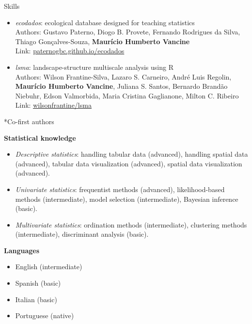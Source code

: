 \documentclass{resume}
\begin{document}
\begin{rSection}{Skills}
\begin{itemize}
\item \textit{ecodados}: ecological database designed for teaching statistics\\
Authors: Gustavo Paterno, Diogo B. Provete, Fernando Rodrigues da Silva, Thiago Gonçalves-Souza, \textbf{Maurício Humberto Vancine}\\
Link: \href{https://paternogbc.github.io/ecodados/}{\underline{paternogbc.github.io/ecodados}}

\item \textit{lsma}: landscape-structure multiscale analysis using R\\
Authors: Wilson Frantine-Silva, Lazaro S. Carneiro, André Luis Regolin, \textbf{Maurício Humberto Vancine}, Juliana S. Santos, Bernardo Brandão Niebuhr, Edson Valmorbida, Maria Cristina Gaglianone, Milton C. Ribeiro\\
Link: \href{https://github.com/wilsonfrantine/landscapeDecoupler}{\underline{wilsonfrantine/lsma}}

\end{itemize} 

*Co-first authors

\textbf{Statistical knowledge}

\begin{itemize} 
\item \textit{Descriptive statistics}: handling tabular data (advanced), handling spatial data (advanced), tabular data visualization (advanced), spatial data visualization (advanced).

\item \textit{Univariate statistics}: frequentist methods (advanced), likelihood-based methods (intermediate), model selection (intermediate), Bayesian inference (basic).

\item \textit{Multivariate statistics}: ordination methods (intermediate), clustering methods (intermediate), discriminant analysis (basic).
\end{itemize}

\textbf{Languages}
\begin{itemize}
\item English (intermediate)
\item Spanish (basic)
\item Italian (basic)
\item Portuguese (native)
\end{itemize}

\end{rSection}
\end{document}
